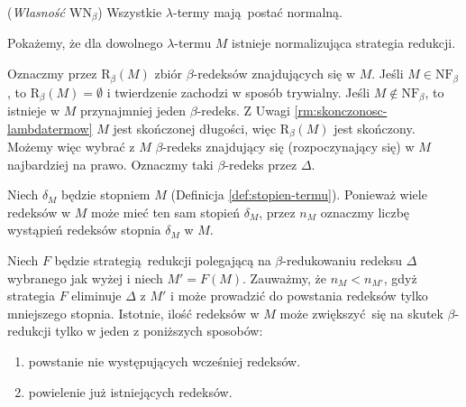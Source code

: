 \begin{twierdzenie}\label{thm:wn}(\emph{Własność \(\mathrm{WN}_{\beta}\)}) Wszystkie \(\lambda\)-termy mają postać normalną.
\end{twierdzenie}
\begin{dowod}
  Pokażemy, że dla dowolnego \(\lambda\)-termu \(M\) istnieje normalizująca strategia redukcji.

  Oznaczmy przez \(\mathrm{R}_\beta(M)\) zbiór \(\beta\)-redeksów znajdujących się w \(M\). Jeśli \(M\in \mathrm{NF}_\beta\), to \(\mathrm{R}_\beta(M)=\emptyset\) i twierdzenie zachodzi w sposób trywialny. Jeśli \(M\not\in \mathrm{NF}_\beta\), to istnieje w \(M\) przynajmniej jeden \(\beta\)-redeks. Z Uwagi \ref{rm:skonczonosc-lambdatermow} \(M\) jest skończonej długości, więc \(\mathrm{R}_\beta(M)\) jest skończony. Możemy więc wybrać z \(M\) \(\beta\)-redeks znajdujący się (rozpoczynający się) w \(M\) najbardziej na prawo. Oznaczmy taki \(\beta\)-redeks przez \(\Delta\).

  Niech \(\delta_M\) będzie stopniem \(M\) (Definicja \ref{def:stopien-termu}). Ponieważ wiele redeksów w \(M\) może mieć ten sam stopień \(\delta_M\), przez \(n_M\) oznaczmy liczbę wystąpień redeksów stopnia \(\delta_M\) w \(M\).

  Niech \(F\) będzie strategią redukcji polegającą na \(\beta\)-redukowaniu redeksu \(\Delta\) wybranego jak wyżej i niech \(M'=F(M)\).
  Zauważmy, że \(n_M < n_{M'}\), gdyż strategia \(F\) eliminuje \(\Delta\) z \(M'\) i może prowadzić do powstania redeksów tylko mniejszego stopnia.
  Istotnie, ilość redeksów w \(M\) może zwiększyć się na skutek \(\beta\)-redukcji tylko w jeden z poniższych sposobów:
  \begin{enumerate}[label=\roman*)]
    \item powstanie nie występujących wcześniej redeksów.\label{itm:wn-1}
    \item powielenie już istniejących redeksów.
  \end{enumerate}


\end{dowod}
